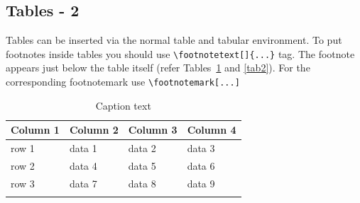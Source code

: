 \documentclass{article}
\begin{document}



\subsection{Tables - 2}\label{sec5}

Tables can be inserted via the normal table and tabular environment. To put
footnotes inside tables you should use \verb+\footnotetext[]{...}+ tag.
The footnote appears just below the table itself (refer Tables~\ref{tab1} and \ref{tab2}). 
For the corresponding footnotemark use \verb+\footnotemark[...]+

\begin{table}[h]
\begin{center}
\begin{minipage}{174pt}
\caption{Caption text}\label{tab1}%
\begin{tabular}{@{}llll@{}}
\toprule
Column 1 & Column 2  & Column 3 & Column 4\\
\midrule
row 1    & data 1   & data 2  & data 3  \\
row 2    & data 4   & data 5\footnotemark[1]  & data 6  \\
row 3    & data 7   & data 8  & data 9\footnotemark[2]  \\
\botrule
\end{tabular}
\end{minipage}
\end{center}
\end{table}
\end{document}
